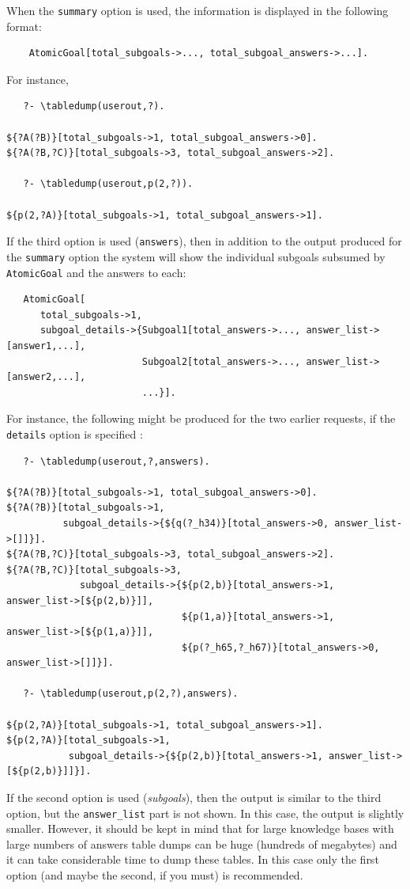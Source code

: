 \documentclass[11pt]{article}
\begin{document}
When the \texttt{summary}  option is used, the information is displayed in the
following format:
\begin{verbatim}
    AtomicGoal[total_subgoals->..., total_subgoal_answers->...].
\end{verbatim}
For instance,
\begin{verbatim}
   ?- \tabledump(userout,?).

${?A(?B)}[total_subgoals->1, total_subgoal_answers->0].
${?A(?B,?C)}[total_subgoals->3, total_subgoal_answers->2].

   ?- \tabledump(userout,p(2,?)).

${p(2,?A)}[total_subgoals->1, total_subgoal_answers->1].
\end{verbatim}
If the third option is used (\texttt{answers}),
then in addition to the output
produced for the \texttt{summary} option the system will show the
individual subgoals subsumed by \texttt{AtomicGoal} and the answers to
each:
\begin{verbatim}
   AtomicGoal[
      total_subgoals->1,
      subgoal_details->{Subgoal1[total_answers->..., answer_list->[answer1,...],
                        Subgoal2[total_answers->..., answer_list->[answer2,...],
                        ...}].
\end{verbatim}
For instance, the following might be produced for the two earlier requests,
if the \texttt{details} option is specified :
\begin{verbatim}
   ?- \tabledump(userout,?,answers).

${?A(?B)}[total_subgoals->1, total_subgoal_answers->0].
${?A(?B)}[total_subgoals->1,
          subgoal_details->{${q(?_h34)}[total_answers->0, answer_list->[]]}].
${?A(?B,?C)}[total_subgoals->3, total_subgoal_answers->2].
${?A(?B,?C)}[total_subgoals->3,
             subgoal_details->{${p(2,b)}[total_answers->1, answer_list->[${p(2,b)}]],
                               ${p(1,a)}[total_answers->1, answer_list->[${p(1,a)}]],
                               ${p(?_h65,?_h67)}[total_answers->0, answer_list->[]]}].

   ?- \tabledump(userout,p(2,?),answers).

${p(2,?A)}[total_subgoals->1, total_subgoal_answers->1].
${p(2,?A)}[total_subgoals->1,
           subgoal_details->{${p(2,b)}[total_answers->1, answer_list->[${p(2,b)}]]}].

\end{verbatim}
If the second option is used (\emph{subgoals}), then the output is similar
to the third option, but the \texttt{answer\_list} part is not shown.  In
this case, the output is slightly smaller. However, it should be kept in
mind that for large knowledge bases with large numbers
of answers table dumps can
be huge (hundreds of megabytes) and it can take
considerable time to dump these tables. In this case only the first option
(and maybe the second, if you must) is recommended.
\end{document}
